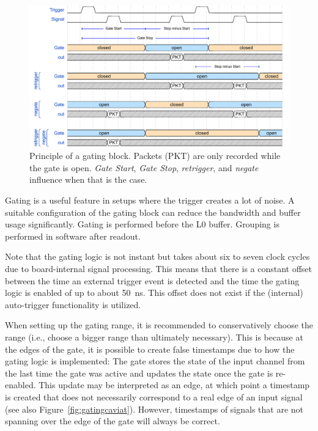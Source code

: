 {    \begin{figure}[bth]
        \centering
        \includegraphics[width=1.0\linewidth]{figures/gating_principle.pdf}
        \caption{Principle of a gating block.
            Packets (PKT) are only recorded
            while the gate is open.
            \emph{Gate Start}, \emph{Gate Stop},
            \emph{retrigger}, and \emph{negate} influence when that is the 
            case.}
        \label{fig:gatingprinciple}
    \end{figure}
    
    Gating is a useful feature in setups where the trigger creates a lot of
    noise.  A suitable configuration of the gating block can reduce the
    bandwidth and buffer usage significantly.  Gating is performed before the
    L0 buffer. Grouping is performed in software after readout. 

    Note that the gating logic is not instant but takes about six to seven
    clock cycles due to board-internal signal processing. 
    This means that there is a constant offset between the time an
    external trigger event is detected and the time the gating logic is
    enabled of up to about 50~ns.
    This offset does not exist if the (internal) auto-trigger functionality
    is utilized.

    When setting up the gating range, it is recommended to conservatively 
    choose the range (i.e., choose a bigger range than ultimately necessary).
    This is because at the edges of the gate, it is possible
    to create false timestamps due to how the gating logic is implemented: 
    The gate stores the state of the input channel from the last time the
    gate was active and updates the state once the gate is re-enabled. This
    update may be interpreted as an edge, at which point a timestamp is
    created that does not necessarily correspond to a real edge of an input
    signal (see also Figure~\ref{fig:gatingcaviat}).
    However, timestamps of signals that are not spanning over the edge of the 
    gate will always be correct.

}
